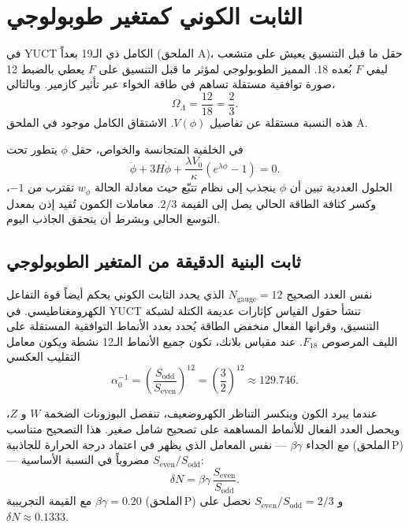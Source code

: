 \documentclass[12pt,a4paper]{article}
\begin{document}
	\section{الثابت الكوني كمتغير طوبولوجي}
	في YUCT الكامل ذي الـ19 بعداً (الملحق A)، حقل ما قبل التنسيق يعيش على متشعب ليفي \(F\) بُعده 18. المميز الطوبولوجي لمؤثر ما قبل التنسيق على \(F\) يعطي بالضبط 12 صورة توافقية مستقلة تساهم في طاقة الخواء عبر تأثير كازمير. وبالتالي،
	\begin{equation}
		\Omega_\Lambda = \frac{12}{18} = \frac{2}{3}.
		\label{eq:OmegaLambda}
	\end{equation}
	هذه النسبة مستقلة عن تفاصيل \(V(\phi)\). الاشتقاق الكامل موجود في الملحق A.
	
	في الخلفية المتجانسة والخواص، حقل \(\phi\) يتطور تحت
	\[
	\ddot\phi + 3H \dot\phi + \frac{\lambda V_0}{\kappa}(e^{\lambda\phi}-1) = 0.
	\]
	الحلول العددية تبين أن \(\phi\) ينجذب إلى نظام تتبّع حيث معادلة الحالة \(w_\phi\) تقترب من \(-1\)، وكسر كثافة الطاقة الحالي يصل إلى القيمة \(2/3\). معاملات الكمون تُقيد إذن بمعدل التوسع الحالي وبشرط أن يتحقق الجاذب اليوم.
	
	\subsection{ثابت البنية الدقيقة من المتغير الطوبولوجي}
	نفس العدد الصحيح \(N_{\mathrm{gauge}} = 12\) الذي يحدد الثابت الكوني يحكم أيضاً قوة التفاعل الكهرومغناطيسي. في YUCT تنشأ حقول القياس كإثارات عديمة الكتلة لشبكة التنسيق، وقرانها الفعال منخفض الطاقة يُحدد بعدد الأنماط التوافقية المستقلة على الليف المرصوص \(F_{18}\). عند مقياس بلانك، تكون جميع الأنماط الـ12 نشطة ويكون معامل التقليب العكسي
	\begin{equation}
		\alpha_0^{-1} = \left( \frac{S_{\mathrm{odd}}}{S_{\mathrm{even}}} \right)^{12}
		= \left( \frac{3}{2} \right)^{12} \approx 129.746 .
	\end{equation}
	
	عندما يبرد الكون وينكسر التناظر الكهروضعيف، تنفصل البوزونات الضخمة \(W\) و \(Z\)، ويحصل العدد الفعال للأنماط المساهمة على تصحيح شامل صغير. هذا التصحيح متناسب مع الجداء \(\beta\gamma\) — نفس المعامل الذي يظهر في اعتماد درجة الحرارة للجاذبية (الملحق P) — مضروباً في النسبة الأساسية \(S_{\mathrm{even}}/S_{\mathrm{odd}}\):
	\begin{equation}
		\delta N = \beta\gamma \, \frac{S_{\mathrm{even}}}{S_{\mathrm{odd}}} .
		\label{eq:deltaN}
	\end{equation}
	مع القيمة التجريبية \(\beta\gamma = 0.20\) (الملحق P) و \(S_{\mathrm{even}}/S_{\mathrm{odd}} = 2/3\) نحصل على \(\delta N \approx 0.1333\).
	
\end{document}

